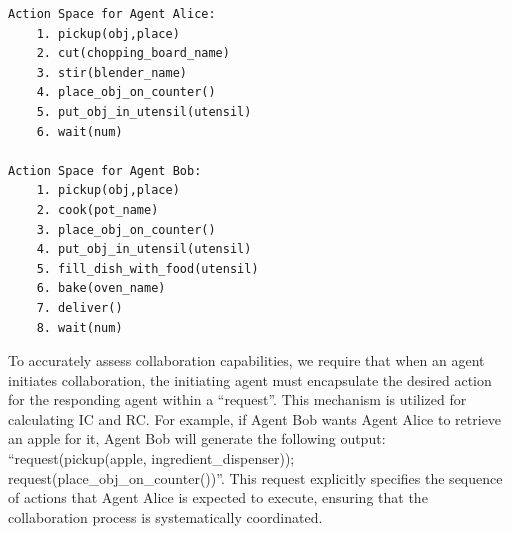 \documentclass[11pt]{article}
\begin{document}
\lstset{
    basicstyle=\ttfamily\small,  
    frame=single,               
    breaklines=true,             
    columns=fullflexible,        
    keepspaces=true,              
}


\label{lst-action-space}
\begin{lstlisting}[caption={Action Space List}]
Action Space for Agent Alice:
    1. pickup(obj,place)
    2. cut(chopping_board_name)
    3. stir(blender_name)
    4. place_obj_on_counter()
    5. put_obj_in_utensil(utensil)
    6. wait(num)   

Action Space for Agent Bob:
    1. pickup(obj,place)
    2. cook(pot_name)
    3. place_obj_on_counter()
    4. put_obj_in_utensil(utensil) 
    5. fill_dish_with_food(utensil)
    6. bake(oven_name)
    7. deliver()
    8. wait(num)
\end{lstlisting}


To accurately assess collaboration capabilities, we require that when an agent initiates collaboration, the initiating agent must encapsulate the desired action for the responding agent within a ``request''. This mechanism is utilized for calculating IC and RC. For example, if Agent Bob wants Agent Alice to retrieve an apple for it, Agent Bob will generate the following output: ``request(pickup(apple, ingredient\_dispenser)); request(place\_obj\_on\_counter())''. This request explicitly specifies the sequence of actions that Agent Alice is expected to execute, ensuring that the collaboration process is systematically coordinated.
\end{document}
